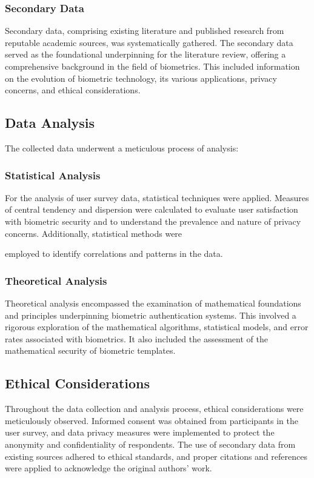 \documentclass{IEEEtran}
\begin{document}
\subsubsection{Secondary Data}
Secondary data, comprising existing literature and published research from reputable academic sources, was systematically gathered. The secondary data served as the foundational underpinning for the literature review, offering a comprehensive background in the field of biometrics. This included information on the evolution of biometric technology, its various applications, privacy concerns, and ethical considerations.

\subsection{Data Analysis}
The collected data underwent a meticulous process of analysis:

\subsubsection{Statistical Analysis}
For the analysis of user survey data, statistical techniques were applied. Measures of central tendency and dispersion were calculated to evaluate user satisfaction with biometric security and to understand the prevalence and nature of privacy concerns. Additionally, statistical methods were

employed to identify correlations and patterns in the data.

\subsubsection{Theoretical Analysis}
Theoretical analysis encompassed the examination of mathematical foundations and principles underpinning biometric authentication systems. This involved a rigorous exploration of the mathematical algorithms, statistical models, and error rates associated with biometrics. It also included the assessment of the mathematical security of biometric templates.

\subsection{Ethical Considerations}
Throughout the data collection and analysis process, ethical considerations were meticulously observed. Informed consent was obtained from participants in the user survey, and data privacy measures were implemented to protect the anonymity and confidentiality of respondents. The use of secondary data from existing sources adhered to ethical standards, and proper citations and references were applied to acknowledge the original authors' work.
\end{document}
